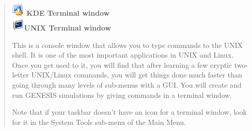 \documentclass[12pt]{article}
\begin{document}
\begin{quote}
	\includegraphics[width=0.05\textwidth]{figs/konsole.eps} {\bf KDE Terminal window} \\
	\includegraphics[width=0.05\textwidth]{figs/gnome-term.eps}{\bf UNIX Terminal window}

This is a console window that allows you to type commands to the UNIX shell. It is one of the most important applications in UNIX and Linux. Once you get used to it, you will find that after learning a few cryptic two-letter UNIX/Linux commands, you will get things done much faster than going through many levels of sub-menus with a GUI. You will create and run GENESIS simulations by giving commands in a terminal window.

Note that if your taskbar doesn't have an icon for a terminal window, look for it in the System Tools sub-menu of the Main Menu.
\end{quote}
\end{document}

